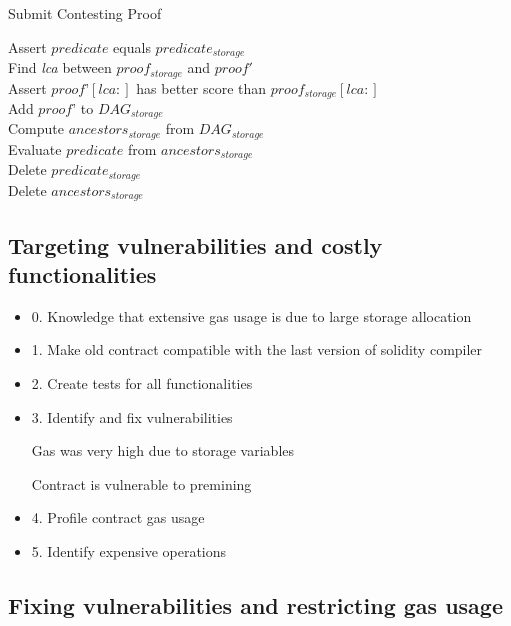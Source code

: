 \begin{algorithm}
\caption{Submit Contesting Proof}
\label{algo:contest_old}
Assert $predicate$ equals $predicate_{storage}$  \\
Find \textit{lca} between $proof_{storage}$ and $proof'$\\
Assert $proof’[lca:]$ has better score than $proof_{storage}[lca:]$ \\
Add $proof’$ to $DAG_{storage}$\\
Compute $ancestors_{storage}$ from $DAG_{storage}$\\
Evaluate $predicate$ from $ancestors_{storage}$\\
Delete $predicate_{storage}$\\
Delete $ancestors_{storage}$\\
\end{algorithm}

\subsection{Targeting vulnerabilities and costly functionalities}

\begin{itemize}
    \item
        0. Knowledge that extensive gas usage is due to large storage
        allocation
    \item
        1. Make old contract compatible with the last version of solidity
        compiler
    \item
        2. Create tests for all functionalities
    \item
        3. Identify and fix vulnerabilities

        Gas was very high due to storage variables

        Contract is vulnerable to premining
    \item
        4. Profile contract gas usage
    \item
        5. Identify expensive operations
\end{itemize}

\subsection{Fixing vulnerabilities and restricting gas usage}

